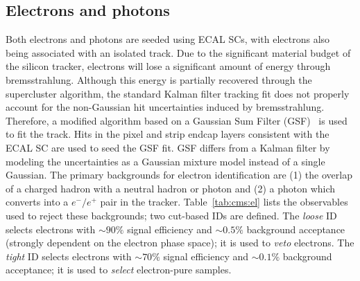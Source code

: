 \subsection{Electrons and photons}

Both electrons and photons are seeded using ECAL SCs, with electrons also being associated with an isolated track.
Due to the significant material budget of the silicon tracker, electrons will lose a significant amount of energy through bremsstrahlung.
Although this energy is partially recovered through the supercluster algorithm, the standard Kalman filter tracking fit does not properly account for the non-Gaussian hit uncertainties induced by bremsstrahlung.
Therefore, a modified algorithm based on a Gaussian Sum Filter (GSF)~\cite{cmstracker,gsf} is used to fit the track.
Hits in the pixel and strip endcap layers consistent with the ECAL SC are used to seed the GSF fit.
GSF differs from a Kalman filter by modeling the uncertainties as a Gaussian mixture model instead of a single Gaussian.
The primary backgrounds for electron identification are (1) the overlap of a charged hadron with a neutral hadron or photon and (2) a photon which converts into a $e^-/e^+$ pair in the tracker.
Table~\ref{tab:cms:el} lists the observables used to reject these backgrounds; two cut-based IDs are defined.
The \emph{loose} ID selects electrons with $\sim90\%$ signal efficiency and $\sim0.5\%$ background acceptance (strongly dependent on the electron phase space); it is used to \emph{veto} electrons. 
The \emph{tight} ID selects electrons with $\sim70\%$ signal efficiency and $\sim0.1\%$ background acceptance; it is used to \emph{select} electron-pure samples. 

